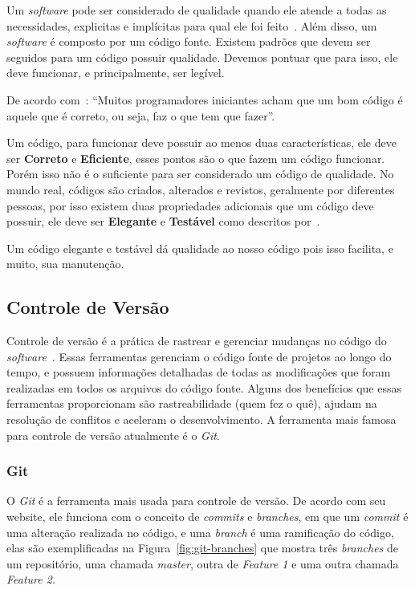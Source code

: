\documentclass[12pt]{article}
\begin{document}
Um \textit{software} pode ser considerado de qualidade quando ele atende a todas as necessidades, explicitas
e implícitas para qual ele foi feito~\cite{Duarte03}. Além disso, um \textit{software} é composto por um código fonte.
Existem padrões que devem ser seguidos para um código possuir qualidade.
Devemos pontuar que para isso, ele deve funcionar, e principalmente, ser legível.

De acordo com~\cite{Levy04}: ``Muitos programadores iniciantes acham que um bom código é aquele que é correto, ou seja, faz o que tem
que fazer''.

Um código, para funcionar deve possuir ao menos duas características, ele deve ser \textbf{Correto} e \textbf{Eficiente},
esses pontos são o que fazem um código funcionar. Porém isso não é o suficiente para ser considerado
um código de qualidade. No mundo real, códigos são criados, alterados e revistos, geralmente por diferentes pessoas,
por isso existem duas propriedades adicionais que um código deve possuir, ele deve ser \textbf{Elegante} e \textbf{Testável}
como descritos por~\cite{Levy04}.

Um código elegante e testável dá qualidade ao nosso código pois isso facilita, e muito, sua manutenção.

\subsection{Controle de Versão}

Controle de versão é a prática de rastrear e gerenciar mudanças no código do \textit{software}~\cite{attlasianGit}.
Essas ferramentas gerenciam o código fonte de projetos ao longo do tempo, e possuem informações detalhadas
de todas as modificações que foram realizadas em todos os arquivos do código fonte.
Alguns dos benefícios que essas ferramentas proporcionam são rastreabilidade (quem fez o quê),
ajudam na resolução de conflitos e aceleram o desenvolvimento. A ferramenta mais famosa para controle de
versão atualmente é o \textit{Git}.

\subsubsection{Git}

O \textit{Git} é a ferramenta mais usada para controle de versão. De acordo com seu website, ele
funciona com o conceito de \textit{commits} e \textit{branches}, em que um \textit{commit}
é uma alteração realizada no código, e uma \textit{branch} é uma ramificação do código, elas são
exemplificadas na Figura~\ref{fig:git-branches} que mostra três \textit{branches} de um repositório,
uma chamada \textit{master}, outra de \textit{Feature 1} e uma outra chamada \textit{Feature 2}.
\end{document}
